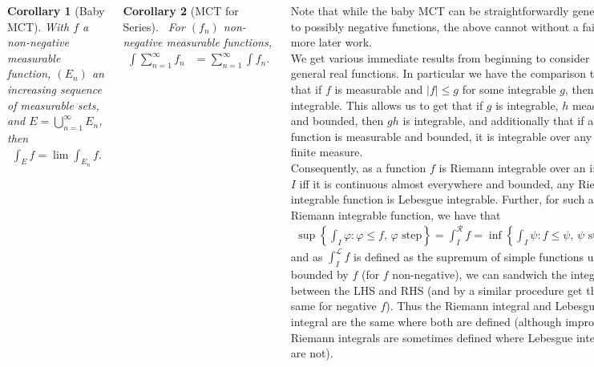 \documentclass{tikzposter} %
\newtheorem{corollary}{Corollary}
\begin{document}
\begin{columns}
{    \begin{corollary}[Baby MCT]
      With $f$ a non-negative measurable function, $(E_{n})$ an increasing sequence of measurable sets, and $E = \bigcup_{n=1}^{\infty} E_{n}$, then
      \begin{align*}
        \int_{E} f = \lim \int_{E_{n}} f.
      \end{align*}
    \end{corollary}
    \hphantom{}

    \begin{corollary}[MCT for Series]
      \ For $(f_{n})$ non-negative measurable functions,
      \begin{align*}
        \int \sum_{n=1}^{\infty} f_{n} &= \sum_{n=1}^{\infty} \int f_{n}.
      \end{align*}
    \end{corollary}
    \hphantom{}

    Note that while the baby MCT can be straightforwardly generalised to possibly negative functions, the above cannot without a fair bit more later work. \\

    We get various immediate results from beginning to consider general real functions. In particular we have the comparison test, that if $f$ is measurable and $|f| \le g$ for some integrable $g$, then $f$ is integrable. This allows us to get that if $g$ is integrable, $h$ measurable and bounded, then $gh$ is integrable, and additionally that if a function is measurable and bounded, it is integrable over any set of finite measure. \\

    Consequently, as a function $f$ is Riemann integrable over an interval $I$ iff it is continuous almost everywhere and bounded, any Riemann integrable function is Lebesgue integrable. Further, for such a Riemann integrable function, we have that
    \begin{align*}
      \sup\left\{ \int_{I} \varphi : \varphi \le f,\,\varphi \text{ step}\right\} = \int_{I}^{\mathcal{R}} f = \inf \left \{\int_{I} \psi : f \le \psi,\,\psi \text{ step}\right\},
    \end{align*}
    and as $\int^{\mathcal{L}}_{I} f$ is defined as the supremum of simple functions upper bounded by $f$ (for $f$ non-negative), we can sandwich the integral between the LHS and RHS (and by a similar procedure get the same for negative $f$). Thus the Riemann integral and Lebesgue integral are the same where both are defined (although improper Riemann integrals are sometimes defined where Lebesgue integrals are not). \\

}
\end{columns}
\end{document}
